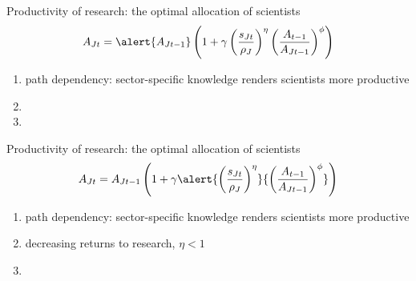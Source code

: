 \documentclass[11pt,aspectratio=169]{beamer}
\begin{document}
\begin{frame}{Productivity of research: the optimal allocation of scientists}
	\pause
	\vspace{-10mm}
	\vspace{4mm}
	\large
	\begin{align*}
		A_{Jt}=\alert{A_{Jt-1}}\left(1+\gamma\left(\frac{s_{Jt}}{\rho_J}\right)^\eta\left(\frac{A_{t-1}}{A_{Jt-1}}\right)^\phi\right)
	\end{align*}
	\normalsize
	\begin{enumerate}
		\item \alert{path dependency: sector-specific knowledge renders scientists more productive}
		\item[] %
		\item[] %
	\end{enumerate}
\end{frame}

\addtocounter{framenumber}{-1}
\begin{frame}{Productivity of research: the optimal allocation of scientists}
	\large
	\begin{align*}
		A_{Jt}={A_{Jt-1}}\left(1+\gamma\alert{\left(\frac{s_{Jt}}{\rho_J}\right)^{\eta}}{\left(\frac{A_{t-1}}{A_{Jt-1}}\right)^\phi}\right)
	\end{align*}
	\normalsize
	\begin{enumerate}
		\item path dependency: sector-specific knowledge renders scientists more productive
		\item \alert{decreasing returns to research, $\eta<1$}
		\item[]%
	\end{enumerate}
\end{frame}
\end{document}
